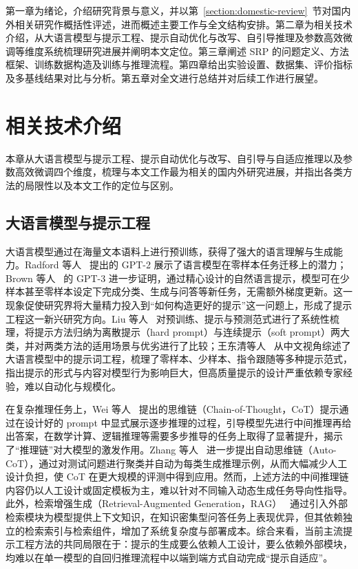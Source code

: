 第一章为绪论，介绍研究背景与意义，并以第~\ref{section:domestic-review}~节对国内外相关研究作概括性评述，进而概述主要工作与全文结构安排。第二章为相关技术介绍，从大语言模型与提示工程、提示自动优化与改写、自引导推理及参数高效微调等维度系统梳理研究进展并阐明本文定位。第三章阐述 SRP 的问题定义、方法框架、训练数据构造及训练与推理流程。第四章给出实验设置、数据集、评价指标及多基线结果对比与分析。第五章对全文进行总结并对后续工作进行展望。


\chapter{相关技术介绍}

本章从大语言模型与提示工程、提示自动优化与改写、自引导与自适应推理以及参数高效微调四个维度，梳理与本文工作最为相关的国内外研究进展，并指出各类方法的局限性以及本文工作的定位与区别。

\section{大语言模型与提示工程}
\label{section:Prompt}

大语言模型通过在海量文本语料上进行预训练，获得了强大的语言理解与生成能力。Radford 等人~\cite{radford2019language} 提出的 GPT-2 展示了语言模型在零样本任务迁移上的潜力；Brown 等人~\cite{Brown:3495724.3495883} 的 GPT-3 进一步证明，通过精心设计的自然语言提示，模型可在少样本甚至零样本设定下完成分类、生成与问答等新任务，无需额外梯度更新。这一现象促使研究界将大量精力投入到“如何构造更好的提示”这一问题上，形成了提示工程这一新兴研究方向。Liu 等人~\cite{Liu:3560815} 对预训练、提示与预测范式进行了系统性梳理，将提示方法归纳为离散提示（hard prompt）与连续提示（soft prompt）两大类，并对两类方法的适用场景与优劣进行了比较；王东清等人~\cite{DongQing202501001} 从中文视角综述了大语言模型中的提示词工程，梳理了零样本、少样本、指令跟随等多种提示范式，指出提示的形式与内容对模型行为影响巨大，但高质量提示的设计严重依赖专家经验，难以自动化与规模化。

在复杂推理任务上，Wei 等人~\cite{Wei:3600270.3602070} 提出的思维链（Chain-of-Thought，CoT）提示通过在设计好的 prompt 中显式展示逐步推理的过程，引导模型先进行中间推理再给出答案，在数学计算、逻辑推理等需要多步推导的任务上取得了显著提升，揭示了“推理链”对大模型的激发作用。Zhang 等人~\cite{zhang2022automatic} 进一步提出自动思维链（Auto-CoT），通过对测试问题进行聚类并自动为每类生成推理示例，从而大幅减少人工设计负担，使 CoT 在更大规模的评测中得到应用。然而，上述方法的中间推理链内容仍以人工设计或固定模板为主，难以针对不同输入动态生成任务导向性指导。此外，检索增强生成（Retrieval-Augmented Generation，RAG）~\cite{lewis2020retrieval} 通过引入外部检索模块为模型提供上下文知识，在知识密集型问答任务上表现优异，但其依赖独立的检索索引与检索组件，增加了系统复杂度与部署成本。综合来看，当前主流提示工程方法的共同局限在于：提示的生成要么依赖人工设计，要么依赖外部模块，均难以在单一模型的自回归推理流程中以端到端方式自动完成“提示自适应”。

